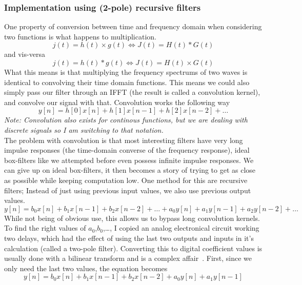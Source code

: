 \documentclass[11pt,a4paper]{article}
\begin{document}
\subsubsection{Implementation using (2-pole) recursive filters}

One property of conversion between time and frequency domain when considering two functions is what happens to multiplication.
\begin{equation}
j(t) = h(t) \times g(t) \iff J(t) = H(t) * G(t)
\end{equation}
and vis-versa
\begin{equation}
j(t) = h(t) * g(t) \iff J(t) = H(t) \times G(t)
\end{equation}
What this means is that multiplying the frequency spectrums of two waves is identical to convolving their time domain functions.
This means we could also simply pass our filter through an IFFT (the result is called a convolution kernel), and convolve our signal with that.
Convolution works the following way
\begin{equation}
y[n] = h[0]x[n] + h[1]x[n-1] + h[2]x[n-2] + \dots
\end{equation}
{\small \it Note: Convolution also exists for continous functions, but we are dealing with discrete signals so I am switching to that notation.}\\
The problem with convolution is that most interesting filters have very long impulse responses (the time-domain converse of the frequency response), ideal box-filters like we attempted before even possess infinite impulse responses.
We can give up on ideal box-filters, it then becomes a story of trying to get as close as possible while keeping computation low. One method for this are recursive filters; Instead of just using previous input values, we also use previous output values.
\begin{equation}
y[n] = b_0x[n] + b_1x[n-1] + b_2x[n-2] + \dots + a_0y[n] + a_1y[n-1] + a_2y[n-2] + \dots
\end{equation}
While not being of obvious use, this allows us to bypass long convolution kernels. To find the right values of $a_0$,$b_0$,\dots, I copied an analog electronical circuit working two delays, which had the effect of using the last two outputs and inputs in it's calculation (called a two-pole filter). Converting this to digital coefficient values is usually done with a bilinear transform and is a complex affair~\cite[chap. 3.5]{ZoranDFD}.
First, since we only need the last two values, the equation becomes
\begin{equation}
y[n] = b_0x[n] + b_1x[n-1] + b_2x[n-2] + a_0y[n] + a_1y[n-1]
\end{equation}
\end{document}
